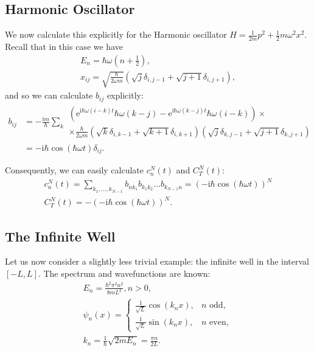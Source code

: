 \documentclass{article}
\newcommand{\e}{\mathrm{e}}
\newcommand{\I}{\mathrm{i}}
\begin{document}
\subsection{Harmonic Oscillator}

We now calculate this explicitly for the Harmonic oscillator $H = \frac1{2m} p^2 + \frac12 m \omega^2 x^2$. Recall that in this case we have
\begin{gather*}
E_n = \hbar \omega (n + \tfrac12),\\
x_{ij} = \sqrt{\frac\hbar{2 \omega m}} (\sqrt{j} \delta_{i,j-1} + \sqrt{j+1} \delta_{i,j+1}), %
\end{gather*}
and so we can calculate $b_{ij}$ explicitly:
\begin{align*}
b_{ij} &= -\frac{\I m}{\hbar} \sum_k \begin{multlined}
\left(\e^{\I \hbar \omega (i-k) t} \hbar \omega (k - j) - \e^{\I \hbar \omega (k-j) t} \hbar \omega (i - k) \right) \times\\
\times \frac{\hbar}{2 \omega m} (\sqrt k \delta_{i, k-1} + \sqrt{k+1} \delta_{i, k+1}) (\sqrt j \delta_{k, j-1} + \sqrt{j+1} \delta_{k, j+1})\end{multlined}\\
&= - \I \hbar \cos(\hbar \omega t) \delta_{ij}.
\end{align*}

Consequently, we can easily calculate $c_n^N(t)$ and $C_T^N(t)$:
\begin{gather*}
c_n^N(t) = \sum_{k_1,\dots, k_{N-1}} b_{nk_1} b_{k_1 k_2} \dots b_{k_{N-1}n} = \left( -\I \hbar \cos(\hbar \omega t) \right)^N\\
C_T^N(t) = - \left( -\I \hbar \cos(\hbar \omega t) \right)^N.
\end{gather*}

\subsection{The Infinite Well}

Let us now consider a slightly less trivial example: the infinite well in the interval $[-L, L]$. The spectrum and wavefunctions are known:
\begin{gather*}
E_n = \frac{\hbar^2 \pi^2 n^2}{8 m L^2}, n > 0,\\
\psi_n(x) = \begin{cases}
\frac1{\sqrt L} \cos(k_n x), & \text{$n$ odd},\\
\frac1{\sqrt L} \sin(k_n x), & \text{$n$ even},
\end{cases}\\
k_n = \frac1\hbar \sqrt{2 m E_n} = \frac{\pi n}{2 L}.
\end{gather*}
\end{document}
